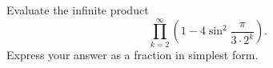 Evaluate the infinite product
\[
	\prod_{k=2}^{\infty}\left(1-4\sin^2\frac{\pi}{3\cdot2^k}\right).
\]
Express your answer as a fraction in simplest form.